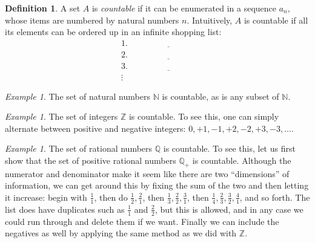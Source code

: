 \documentclass[11pt,oneside]{amsbook}
\newcommand{\N}{\mathbb N}
\newcommand{\Z}{\mathbb Z}
\newcommand{\Q}{\mathbb Q}
\theoremstyle{definition}
\theoremstyle{plain}
\theoremstyle{definition}
\newtheorem{definition}[theorem]{Definition}
\theoremstyle{remark}
\newtheorem{example}[theorem]{Example}
\numberwithin{equation}{section}
\numberwithin{figure}{section}
\begin{document}
\begin{definition}
  A set $A$ is \emph{countable} if it can be enumerated in a sequence $a_n$, whose items are numbered by natural numbers $n$. Intuitively, $A$ is countable if all its elements can be ordered up in an infinite shopping list:
  \begin{align*}
    1.&\quad\underline{\hspace{1in}}\\
    2.&\quad\underline{\hspace{1in}}\\
    3.&\quad\underline{\hspace{1in}}\\
    \vdots&
  \end{align*}
\end{definition}

\begin{example}
  The set of natural numbers $\N$ is countable, as is any subset of $\N$.
\end{example}

\begin{example}
  The set of integers $\Z$ is countable. To see this, one can simply alternate between positive and negative integers: $0,+1,-1,+2,-2,+3,-3,\ldots$.
\end{example}

\begin{example}
  The set of rational numbers $\Q$ is countable. To see this, let us first show that the set of positive rational numbers $\Q_+$ is countable. Although the numerator and denominator make it seem like there are two ``dimensions'' of information, we can get around this by fixing the sum of the two and then letting it increase: begin with $\frac11$, then do $\frac12,\frac21$, then $\frac13,\frac22,\frac31$, then $\frac14,\frac23,\frac32,\frac41$, and so forth. The list does have duplicates such as $\frac11$ and $\frac22$, but this is allowed, and in any case we could run through and delete them if we want. Finally we can include the negatives as well by applying the same method as we did with $\Z$.
\end{example}
\end{document}
